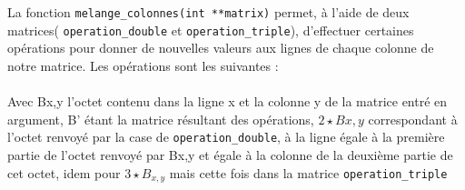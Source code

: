 \documentclass[french, 12pt]{article}
\begin{document}
	La fonction \verb|melange_colonnes(int **matrix)| permet, à l'aide de deux matrices( \verb|operation_double| et \verb|operation_triple|), d'effectuer certaines opérations pour donner de nouvelles valeurs aux lignes de chaque colonne de notre matrice. Les opérations sont les suivantes : \\\\
	Avec B{x,y} l'octet contenu dans la ligne x et la colonne y de la matrice entré en argument, B' étant la matrice résultant des opérations,
	\begin{math}
		 2\star B{x,y}  
	\end{math}
	correspondant à l'octet renvoyé par la case de \verb|operation_double|, à la ligne égale à la première partie de l'octet renvoyé par B{x,y} et égale à la colonne de la deuxième partie de cet octet, idem pour 
	\begin{math}
		3\star B_{x,y} 
	\end{math}
	mais cette fois dans la matrice \verb|operation_triple|
\end{document}
